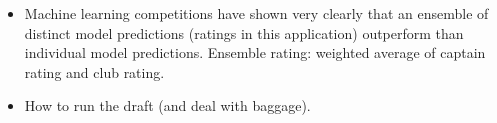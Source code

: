 \begin{itemize}
\item Machine learning competitions have shown very clearly that an ensemble of distinct model predictions (ratings in this application) outperform than individual model predictions. Ensemble rating: weighted average of captain rating and club rating.

\item How to run the draft (and deal with baggage).

\end{itemize}